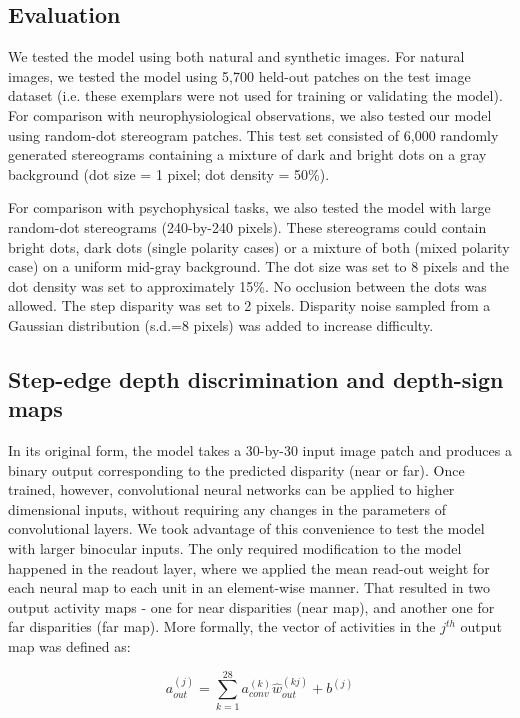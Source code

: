 \subsection{Evaluation}

We tested the model using both natural and synthetic images. For natural images, we tested the model using 5,700 held-out patches on the test image dataset (i.e. these exemplars were not used for training or validating the model). For comparison with neurophysiological observations, we also tested our model using random-dot stereogram patches. This test set consisted of 6,000 randomly generated stereograms containing a mixture of dark and bright dots on a gray background (dot size = 1 pixel; dot density = 50\%).

For comparison with psychophysical tasks, we also tested the model with large random-dot stereograms (240-by-240 pixels). These stereograms could contain bright dots, dark dots (single polarity cases) or a mixture of both (mixed polarity case) on a uniform mid-gray background. The dot size was set to 8 pixels and the dot density was set to approximately 15\%. No occlusion between the dots was allowed. The step disparity was set to 2 pixels. Disparity noise sampled from a Gaussian distribution (s.d.=8 pixels) was added to increase difficulty.

\subsection{Step-edge depth discrimination and depth-sign maps}
In its original form, the model takes a 30-by-30 input image patch and produces a binary output corresponding to the predicted disparity (near or far). Once trained, however, convolutional neural networks can be applied to higher dimensional inputs, without requiring any changes in the parameters of convolutional layers. We took advantage of this convenience to test the model with larger binocular inputs. The only required modification to the model happened in the readout layer, where we applied the mean read-out weight for each neural map to each unit in an element-wise manner. That resulted in two output activity maps - one for near disparities (near map), and another one for far disparities (far map). More formally, the vector of activities in the $j^{th}$ output map was defined as:

\begin{equation}
  a_{out}^{(j)}=\sum_{k=1}^{28} a_{conv}^{(k)}  \hat{w}_{out}^{(kj)}+b^{(j)}
\end{equation}


